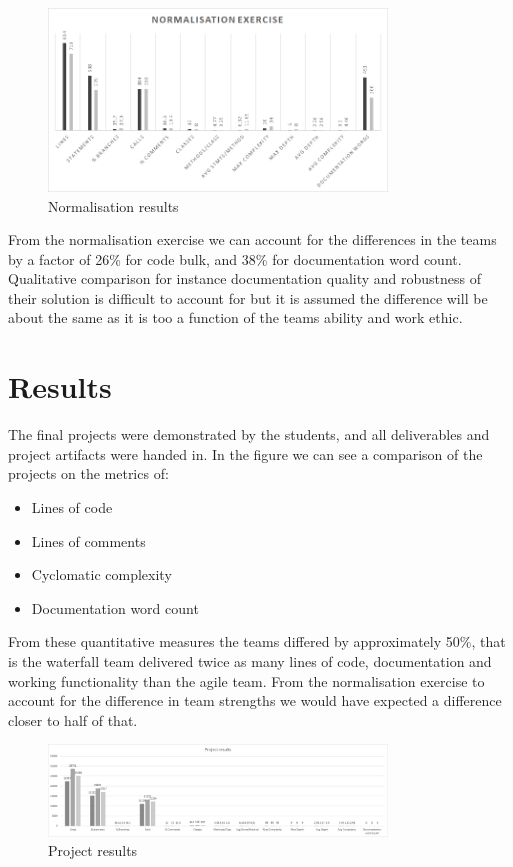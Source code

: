 \documentclass{sig-alternate-05-2015}
\begin{document}
\begin{figure}[t!]
	\centering 
	\includegraphics[width=90mm]{NormalisationExercise.png}
	\caption{Normalisation results}
\end{figure}  

From the normalisation exercise we can account for the differences in the teams by a factor of 26\% for code bulk, and 38\% for documentation word count. Qualitative comparison for instance documentation quality and robustness of their solution is difficult to account for but it is assumed the difference will be about the same as it is too a function of the teams ability and work ethic.

\section{Results}

The final projects were demonstrated by the students, and all deliverables and project artifacts were handed in. In the figure we can see a comparison of the projects on the metrics of:
\begin{itemize}
	\item Lines of code
	\item Lines of comments
	\item Cyclomatic complexity
	\item Documentation word count
\end{itemize}

From these quantitative measures the teams differed by approximately 50\%, that is the waterfall team delivered twice as many lines of code, documentation and working functionality than the agile team. From the normalisation exercise to account for the difference in team strengths we would have expected a difference closer to half of that. 

\begin{figure}[t!]
	\centering 
	\includegraphics[width=90mm]{Project results.png}
	\caption{Project results}
\end{figure}
\end{document}
